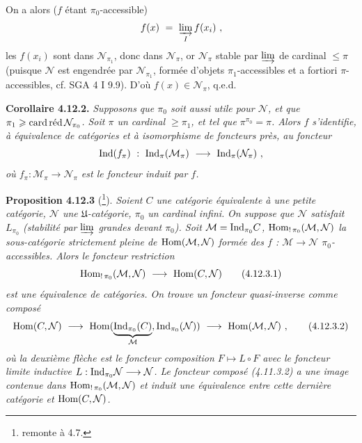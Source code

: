 
On a alors ($f$ étant $\pi_0$-accessible)
\[
f(x) \ = \ \varinjlim_{I} f(x_i) \ ,
\]
les $f(x_i)$ sont dans $\mathcal{N}_{\pi_1}$, donc dans $\mathcal{N}_\pi$, or $\mathcal{N}_\pi$ stable par $\varinjlim$ de cardinal $\leqslant \pi$ (puisque $\mathcal{N}$ est engendrée par $\mathcal{N}_{\pi_1}$, formée d'objets $\pi_1$-accessibles et a fortiori $\pi$-accessibles, cf. SGA 4 I 9.9). D'où $f(x) \in \mathcal{N}_\pi$, q.e.d.

\textbf{Corollaire 4.12.2.} \textit{Supposons que $\pi_0$ soit aussi utile pour $\mathcal{N}$, et que $\pi_1 \geqslant \cardred \mathcal{N}_{\pi_0}$. Soit $\pi$ un cardinal $\geqslant \pi_1$, et tel que $\pi^{\pi_0} = \pi$. Alors $f$ s'identifie, à équivalence de catégories et à isomorphisme de foncteurs près, au foncteur}
\[
\Ind(f_\pi) \ : \ \Ind_\pi(\mathcal{M}_\pi) \ \longrightarrow \ \Ind_\pi(\mathcal{N}_\pi) \ ,
\]
\textit{où $f_\pi : \mathcal{M}_\pi \longrightarrow \mathcal{N}_\pi$ est le foncteur induit par $f$.}

\textbf{Proposition 4.12.3} (\footnote{remonte à 4.7.}). \textit{Soient $C$ une catégorie équivalente à une petite catégorie, $\mathcal{N}$ une $\mathfrak{U}$-catégorie, $\pi_0$ un cardinal infini.}  \textit{On suppose que $\mathcal{N}$ satisfait $L_{\pi_0}$ (stabilité par $\varinjlim$ grandes devant $\pi_0$). Soit $\mathcal{M} = \Ind_{\pi_0} C$, $\Hom_{!\,\pi_0}(\mathcal{M},\mathcal{N})$ la sous-catégorie strictement pleine de $\Hom(\mathcal{M},\mathcal{N})$ formée des $f$ : $\mathcal{M} \longrightarrow \mathcal{N}$ $\pi_0$-accessibles. Alors le foncteur restriction}
\[
\Hom_{!\,\pi_0}(\mathcal{M},\mathcal{N}) \ \longrightarrow \ \Hom(C,\mathcal{N}) \tag*{(4.12.3.1)}
\]
\textit{est une équivalence de catégories. On trouve un foncteur quasi-inverse comme composé}
\[
\Hom(C,\mathcal{N}) \ \longrightarrow \ \Hom(\underbrace{\Ind_{\pi_0}(C)}_{\mathcal{M}},\Ind_{\pi_0}(\mathcal{N})) \ \longrightarrow \ \Hom(\mathcal{M},\mathcal{N}) \ , \tag*{(4.12.3.2)}
\]
\textit{où la deuxième flèche est le foncteur composition $F \longmapsto L \circ F$ avec le foncteur limite inductive $L : \Ind_{\pi_0}\mathcal{N} \longrightarrow \mathcal{N}$. Le foncteur composé (4.11.3.2) a une image contenue dans $\Hom_{!\,\pi_0}(\mathcal{M},\mathcal{N})$ et induit une équivalence entre cette dernière catégorie et $\Hom(C,\mathcal{N})$.} %

